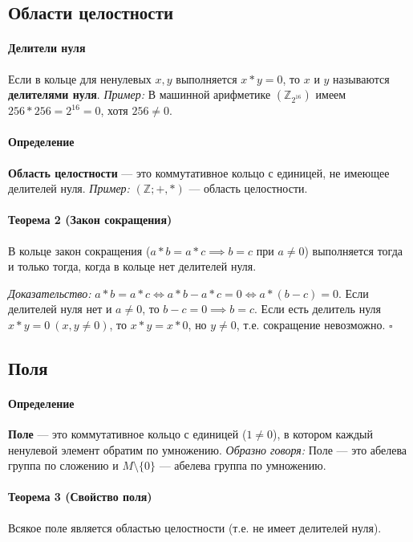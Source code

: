 \subsection*{Области целостности}

\paragraph{Делители нуля}
Если в кольце для ненулевых $x, y$ выполняется $x \ast y = 0$, то $x$ и $y$ называются \textbf{делителями нуля}. 
\textit{Пример:} В машинной арифметике $(\mathbb{Z}_{2^{16}})$ имеем $256 \ast 256 = 2^{16} = 0$, хотя $256 \neq 0$.

\paragraph{Определение}
\textbf{Область целостности} — это коммутативное кольцо с единицей, не имеющее делителей нуля.
\textit{Пример:} $(\mathbb{Z}; +, \ast)$ — область целостности.

\paragraph{Теорема 2 (Закон сокращения)}
В кольце закон сокращения ($a \ast b = a \ast c \implies b = c$ при $a \neq 0$) выполняется тогда и только тогда, когда в кольце нет делителей нуля.

\textit{Доказательство:}
$a \ast b = a \ast c \iff a \ast b - a \ast c = 0 \iff a \ast (b - c) = 0$.
Если делителей нуля нет и $a \neq 0$, то $b - c = 0 \implies b = c$.
Если есть делитель нуля $x \ast y = 0 \ (x, y \neq 0)$, то $x \ast y = x \ast 0$, но $y \neq 0$, т.е. сокращение невозможно. $\square$

\subsection*{Поля}

\paragraph{Определение}
\textbf{Поле} — это коммутативное кольцо с единицей ($1 \neq 0$), в котором каждый ненулевой элемент обратим по умножению. 
\textit{Образно говоря:} Поле — это абелева группа по сложению и $M \setminus \{0\}$ — абелева группа по умножению.

\paragraph{Теорема 3 (Свойство поля)}
Всякое поле является областью целостности (т.е. не имеет делителей нуля).

